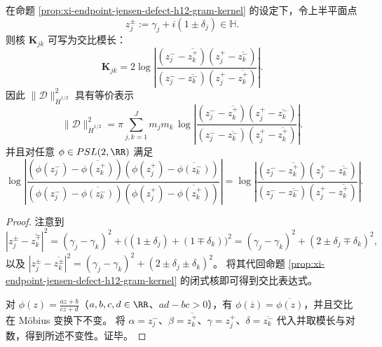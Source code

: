 \begin{proposition}\label{prop:xi-endpoint-jensen-defect-h12-crossratio-mobius}
在命题 \ref{prop:xi-endpoint-jensen-defect-h12-gram-kernel} 的设定下，令上半平面点
\[
z_j^\pm:=\gamma_j+i(1\pm\delta_j)\in\mathbb H.
\]
则核 \(\mathbf K_{jk}\) 可写为交比模长：
\[
\mathbf K_{jk}
=2\log\left|
\frac{(z_j^- - \overline{z_k^+})(z_j^+ - \overline{z_k^-})}{(z_j^- - \overline{z_k^-})(z_j^+ - \overline{z_k^+})}
\right|.
\]
因此 \(\|\mathcal D\|_{\dot H^{1/2}}^2\) 具有等价表示
\[
\|\mathcal D\|_{\dot H^{1/2}}^2
=\pi\sum_{j,k=1}^{J} m_jm_k\,
\log\left|
\frac{(z_j^- - \overline{z_k^+})(z_j^+ - \overline{z_k^-})}{(z_j^- - \overline{z_k^-})(z_j^+ - \overline{z_k^+})}
\right|.
\]
并且对任意 \(\phi\in PSL(2,\RR)\) 满足
\[
\log\left|
\frac{(\phi(z_j^-)-\overline{\phi(z_k^+)})(\phi(z_j^+)-\overline{\phi(z_k^- )})}{(\phi(z_j^-)-\overline{\phi(z_k^-)})(\phi(z_j^+)-\overline{\phi(z_k^+)})}
\right|
=
\log\left|
\frac{(z_j^- - \overline{z_k^+})(z_j^+ - \overline{z_k^-})}{(z_j^- - \overline{z_k^-})(z_j^+ - \overline{z_k^+})}
\right|.
\]
\end{proposition}
\begin{proof}
注意到
\[
|z_j^\pm-\overline{z_k^\mp}|^2
=(\gamma_j-\gamma_k)^2+\bigl((1\pm\delta_j)+(1\mp\delta_k)\bigr)^2
=(\gamma_j-\gamma_k)^2+(2\pm\delta_j\mp\delta_k)^2,
\]
以及
\(
|z_j^\pm-\overline{z_k^\pm}|^2=(\gamma_j-\gamma_k)^2+(2\pm\delta_j\pm\delta_k)^2
\)。
将其代回命题 \ref{prop:xi-endpoint-jensen-defect-h12-gram-kernel} 的闭式核即可得到交比表达式。
\par
对 \(\phi(z)=\frac{az+b}{cz+d}\)（\(a,b,c,d\in\RR\)、\(ad-bc>0\)），有 \(\phi(\overline z)=\overline{\phi(z)}\)，并且交比在 Möbius 变换下不变。
将
\(\alpha=z_j^-\)、\(\beta=\overline{z_k^+}\)、\(\gamma=z_j^+\)、\(\delta=\overline{z_k^-}\)
代入并取模长与对数，得到所述不变性。证毕。
\end{proof}

\endinput
